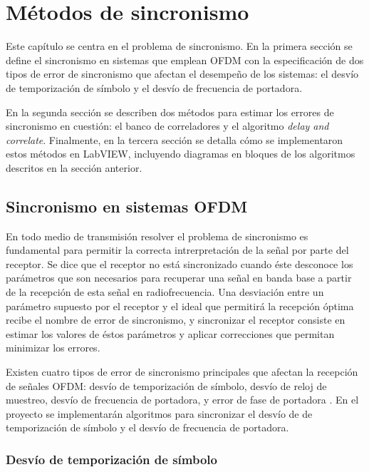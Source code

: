 \chapter{Métodos de sincronismo}
\label{Ch:3}
\graphicspath{{figs/}}

Este capítulo se centra en el problema de sincronismo. En la primera sección se define el sincronismo en sistemas que emplean OFDM con la especificación de dos tipos de error de sincronismo que afectan el desempeño de los sistemas: el desvío de temporización de símbolo y el desvío de frecuencia de portadora. 

En la segunda sección se describen dos métodos para estimar los errores de sincronismo en cuestión: el banco de correladores y el algoritmo \textit{delay and correlate}. Finalmente, en la tercera sección se detalla cómo se implementaron estos métodos en LabVIEW, incluyendo diagramas en bloques de los algoritmos descritos en la sección anterior.

\section{Sincronismo en sistemas OFDM}
\label{S:ch3-sincronismo}

En todo medio de transmisión resolver el problema de sincronismo es fundamental para permitir la correcta intrerpretación de la señal por parte del receptor. Se dice que el receptor no está sincronizado cuando éste desconoce los parámetros que son necesarios para recuperar una señal en banda base a partir de la recepción de esta señal en radiofrecuencia. Una desviación entre un parámetro supuesto por el receptor y el ideal que permitirá la recepción óptima recibe el nombre de error de sincronismo, y sincronizar el receptor consiste en estimar los valores de éstos parámetros y aplicar correcciones que permitan minimizar los errores.

Existen cuatro tipos de error de sincronismo principales que afectan la recepción de señales OFDM: desvío de temporización de símbolo, desvío de reloj de muestreo, desvío de frecuencia de portadora, y error de fase de portadora \cite{chiueh}. En el proyecto se implementarán algoritmos para sincronizar el desvío de de temporización de símbolo y el desvío de frecuencia de portadora.

\subsection{Desvío de temporización de símbolo}
\label{Ss:ch3-sincronismo-tiempo}

